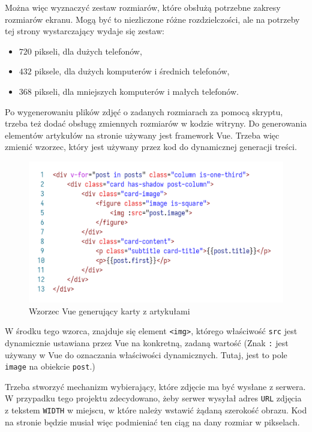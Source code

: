 \documentclass[licencjacka]{pracadypl}
\begin{document}
Można więc wyznaczyć zestaw rozmiarów, które obsłużą potrzebne zakresy rozmiarów ekranu. Mogą być to niezliczone różne rozdzielczości, ale na potrzeby tej strony wystarczający wydaje się zestaw:

\begin{itemize}
  \item $720$ pikseli, dla dużych telefonów,
  \item $432$ piksele, dla dużych komputerów i średnich telefonów,
  \item $368$ pikseli, dla mniejszych komputerów i małych telefonów.
\end{itemize}
 
Po wygenerowaniu plików zdjęć o zadanych rozmiarach za pomocą skryptu, trzeba też dodać obsługę zmiennych rozmiarów w kodzie witryny. Do generowania elementów artykułów na stronie używany jest framework Vue. Trzeba więc zmienić wzorzec, który jest używany przez kod do dynamicznej generacji treści.

\begin{figure}[H]
  \includegraphics[width=\linewidth]{images/code-vue-image-card-old.png}
  \caption{Wzorzec Vue generujący karty z artykułami}
  \label{fig:code-vue-template-articles-old}
\end{figure}

W środku tego wzorca, znajduje się element \texttt{<img>}, którego właściwość \texttt{src} jest dynamicznie ustawiana przez Vue na konkretną, zadaną wartość (Znak \texttt{:} jest używany w Vue do oznaczania właściwości dynamicznych. Tutaj, jest to pole \texttt{image} na obiekcie \texttt{post}.)

Trzeba stworzyć mechanizm wybierający, które zdjęcie ma być wysłane z serwera. W przypadku tego projektu zdecydowano, żeby serwer wysyłał adres \texttt{URL} zdjęcia z tekstem \texttt{WIDTH} w miejscu, w które należy wstawić żądaną szerokość obrazu. Kod na stronie będzie musiał więc podmieniać ten ciąg na dany rozmiar w pikselach.
\end{document}
